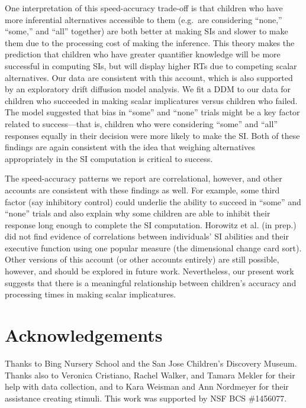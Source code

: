 \documentclass[10pt, letterpaper]{article}
\begin{document}
One interpretation of this speed-accuracy trade-off is that children who
have more inferential alternatives accessible to them (e.g.~are
considering ``none,'' ``some,'' and ``all'' together) are both better at
making SIs and slower to make them due to the processing cost of making
the inference. This theory makes the prediction that children who have
greater quantifier knowledge will be more successful in computing SIs,
but will display higher RTs due to competing scalar alternatives. Our
data are consistent with this account, which is also supported by an
exploratory drift diffusion model analysis. We fit a DDM to our data for
children who succeeded in making scalar implicatures versus children who
failed. The model suggested that bias in ``some'' and ``none'' trials
might be a key factor related to success---that is, children who were
considering ``some'' and ``all'' responses equally in their decision
were more likely to make the SI. Both of these findings are again
consistent with the idea that weighing alternatives appropriately in the
SI computation is critical to success.

The speed-accuracy patterns we report are correlational, however, and
other accounts are consistent with these findings as well. For example,
some third factor (say inhibitory control) could underlie the ability to
succeed in ``some'' and ``none'' trials and also explain why some
children are able to inhibit their response long enough to complete the
SI computation. Horowitz et al. (in prep.) did not find evidence of
correlations between individuals' SI abilities and their executive
function using one popular measure (the dimensional change card sort).
Other versions of this account (or other accounts entirely) are still
possible, however, and should be explored in future work. Nevertheless,
our present work suggests that there is a meaningful relationship
between children's accuracy and processing times in making scalar
implicatures.

\section{Acknowledgements}\label{acknowledgements}

Thanks to Bing Nursery School and the San Jose Children's Discovery
Museum. Thanks also to Veronica Cristiano, Rachel Walker, and Tamara
Mekler for their help with data collection, and to Kara Weisman and Ann
Nordmeyer for their assistance creating stimuli. This work was supported
by NSF BCS \#1456077.
\end{document}
